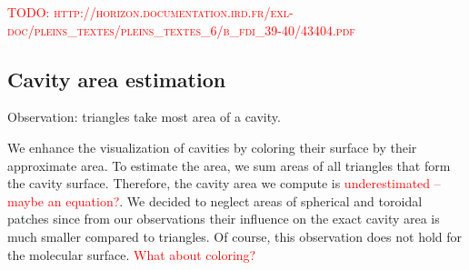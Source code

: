 \textcolor{red}{TODO: \textsc{http://horizon.documentation.ird.fr/exl-doc/pleins\_textes/pleins\_textes\_6/b\_fdi\_39-40/43404.pdf}}

\subsection{Cavity area estimation}
Observation: triangles take most area of a cavity.

We enhance the visualization of cavities by coloring their surface by their approximate area.
To estimate the area, we sum areas of all triangles that form the cavity surface.
Therefore, the cavity area we compute is \textcolor{red}{underestimated -- maybe an equation?}.
We decided to neglect areas of spherical and toroidal patches since from our observations their influence on the exact cavity area is much smaller compared to triangles.
Of course, this observation does not hold for the molecular surface.
\textcolor{red}{What about coloring?}
